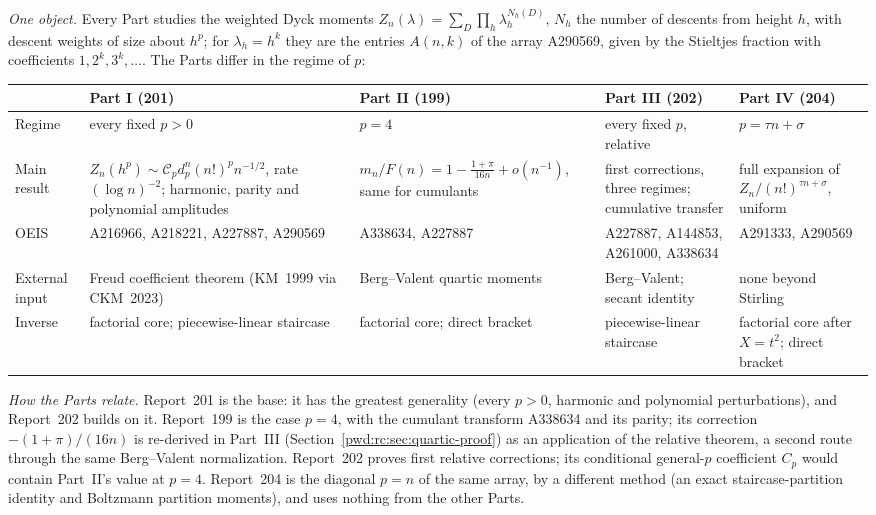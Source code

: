 \documentclass[11pt,letterpaper]{article}
\numberwithin{equation}{section}
\theoremstyle{remark}\newtheorem{remark}[theorem]{Remark}
\begin{document}
\emph{One object.} Every Part studies the weighted Dyck moments
$Z_n(\lambda)=\sum_D\prod_h\lambda_h^{N_h(D)}$, $N_h$ the number of descents
from height $h$, with descent weights of size about $h^p$; for $\lambda_h=h^k$
they are the entries $A(n,k)$ of the array A290569, given by the Stieltjes
fraction with coefficients $1,2^k,3^k,\dots$. The Parts differ in the regime
of $p$:
\begin{center}
\small
\begin{tabular}{@{}>{\raggedright\arraybackslash}p{}>{\raggedright\arraybackslash}p{}>{\raggedright\arraybackslash}p{}>{\raggedright\arraybackslash}p{}>{\raggedright\arraybackslash}p{}@{}}
\toprule
& Part I (201) & Part II (199) & Part III (202) & Part IV (204)\\
\midrule
Regime & every fixed $p>0$ & $p=4$ & every fixed $p$, relative & $p=\tau n+\sigma$\\
Main result & $Z_n(h^p)\sim\mathcal C_pd_p^n(n!)^pn^{-1/2}$, rate $(\log n)^{-2}$; harmonic, parity and polynomial amplitudes & $m_n/F(n)=1-\frac{1+\pi}{16n}+o(n^{-1})$, same for cumulants & first corrections, three regimes; cumulative transfer & full expansion of $Z_n/(n!)^{\tau n+\sigma}$, uniform\\
OEIS & A216966, A218221, A227887, A290569 & A338634, A227887 & A227887, A144853, A261000, A338634 & A291333, A290569\\
External input & Freud coefficient theorem (KM~1999 via CKM~2023) & Berg--Valent quartic moments & Berg--Valent; secant identity & none beyond Stirling\\
Inverse & factorial core; piecewise-linear staircase & factorial core; direct bracket & piecewise-linear staircase & factorial core after $X=t^2$; direct bracket\\
\bottomrule
\end{tabular}
\end{center}

\emph{How the Parts relate.} Report~201 is the base: it has the greatest
generality (every $p>0$, harmonic and polynomial perturbations), and
Report~202 builds on it. Report~199 is the case $p=4$, with the cumulant
transform A338634 and its parity; its correction $-(1+\pi)/(16n)$ is
re-derived in Part~III (Section~\ref{pwd:rc:sec:quartic-proof}) as an
application of the relative theorem, a second route through the same
Berg--Valent normalization. Report~202 proves first relative corrections; its
conditional general-$p$ coefficient $C_p$ would contain Part~II's value at
$p=4$. Report~204 is the diagonal $p=n$ of the same array, by a different
method (an exact staircase-partition identity and Boltzmann partition
moments), and uses nothing from the other Parts.
\end{document}
